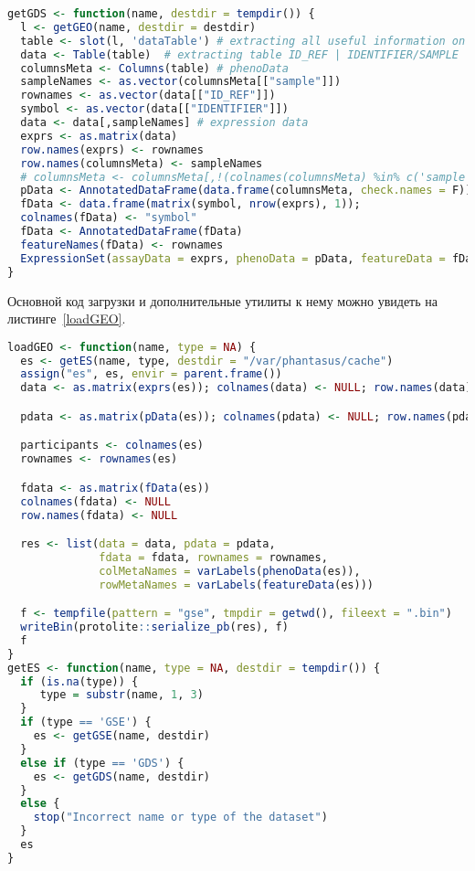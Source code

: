 \begin{lstlisting}[float=!h,caption={Загрузка данных типа GDS из Gene Expression Omnibus},label={getGDS},language=R]
 getGDS <- function(name, destdir = tempdir()) {
  l <- getGEO(name, destdir = destdir)
  table <- slot(l, 'dataTable') # extracting all useful information on dataset
  data <- Table(table)  # extracting table ID_REF | IDENTIFIER/SAMPLE | SAMPLE1 | ...
  columnsMeta <- Columns(table) # phenoData
  sampleNames <- as.vector(columnsMeta[["sample"]])
  rownames <- as.vector(data[["ID_REF"]])
  symbol <- as.vector(data[["IDENTIFIER"]])
  data <- data[,sampleNames] # expression data
  exprs <- as.matrix(data)
  row.names(exprs) <- rownames
  row.names(columnsMeta) <- sampleNames
  # columnsMeta <- columnsMeta[,!(colnames(columnsMeta) %in% c('sample'))] 
  pData <- AnnotatedDataFrame(data.frame(columnsMeta, check.names = F))
  fData <- data.frame(matrix(symbol, nrow(exprs), 1));
  colnames(fData) <- "symbol"
  fData <- AnnotatedDataFrame(fData)
  featureNames(fData) <- rownames
  ExpressionSet(assayData = exprs, phenoData = pData, featureData = fData)
}
\end{lstlisting}

Основной код загрузки и дополнительные утилиты к нему можно увидеть на листинге~\ref{loadGEO}.

\begin{lstlisting}[float=!h,caption={Загрузка данных из Gene Expression Omnibus},label={loadGEO},language=R]
loadGEO <- function(name, type = NA) {
  es <- getES(name, type, destdir = "/var/phantasus/cache")
  assign("es", es, envir = parent.frame())
  data <- as.matrix(exprs(es)); colnames(data) <- NULL; row.names(data) <- NULL

  pdata <- as.matrix(pData(es)); colnames(pdata) <- NULL; row.names(pdata) <- NULL

  participants <- colnames(es)
  rownames <- rownames(es)

  fdata <- as.matrix(fData(es))
  colnames(fdata) <- NULL
  row.names(fdata) <- NULL

  res <- list(data = data, pdata = pdata,
              fdata = fdata, rownames = rownames,
              colMetaNames = varLabels(phenoData(es)),
              rowMetaNames = varLabels(featureData(es)))

  f <- tempfile(pattern = "gse", tmpdir = getwd(), fileext = ".bin")
  writeBin(protolite::serialize_pb(res), f)
  f
}
getES <- function(name, type = NA, destdir = tempdir()) {
  if (is.na(type)) {
     type = substr(name, 1, 3)
  }
  if (type == 'GSE') {
    es <- getGSE(name, destdir)
  }
  else if (type == 'GDS') {
    es <- getGDS(name, destdir)
  }
  else {
    stop("Incorrect name or type of the dataset")
  } 
  es
}
\end{lstlisting}

